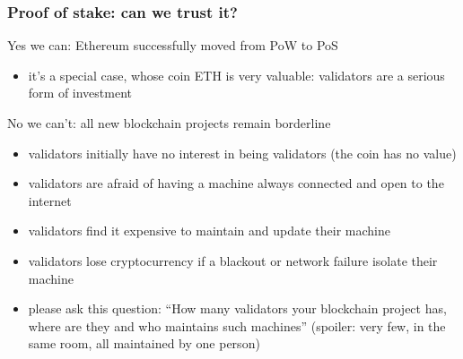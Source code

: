 \documentclass[11pt]{beamer}  %
\begin{document}
\begin{frame}\frametitle{Proof of stake: can we trust it?}

  \begin{greenbox}{Yes we can: Ethereum successfully moved from PoW to PoS}
    \begin{itemize}
    \item it's a special case, whose coin ETH is very valuable: validators are a serious form of investment
    \end{itemize}
  \end{greenbox}

  \bigskip
  
  \begin{redbox}{No we can't: all new blockchain projects remain borderline}
    \begin{itemize}
    \item validators initially have no interest in being validators (the coin has no value)
    \item validators are afraid of having a machine always connected and open to the internet
    \item validators find it expensive to maintain and update their machine
    \item validators lose cryptocurrency if a blackout or network failure isolate their machine
    \item please ask this question: ``How many validators your blockchain project has, where are they and who maintains such machines'' (spoiler: very few, in the same room, all maintained by one person)
    \end{itemize}
  \end{redbox}

\end{frame}
\end{document}
